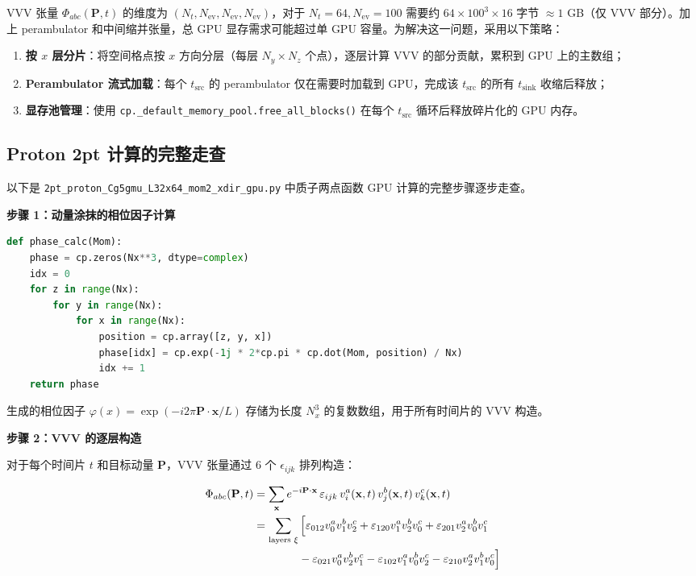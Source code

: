 \documentclass[11pt,a4paper]{ctexart}
\begin{document}
VVV 张量 $\Phi_{abc}(\mathbf{P}, t)$ 的维度为 $(N_t, N_{\text{ev}}, N_{\text{ev}}, N_{\text{ev}})$，对于 $N_t=64, N_{\text{ev}}=100$ 需要约 $64\times 100^3 \times 16$ 字节 $\approx 1$ GB（仅 VVV 部分）。加上 perambulator 和中间缩并张量，总 GPU 显存需求可能超过单 GPU 容量。为解决这一问题，采用以下策略：
\begin{enumerate}
  \item \textbf{按 $x$ 层分片}：将空间格点按 $x$ 方向分层（每层 $N_y\times N_z$ 个点），逐层计算 VVV 的部分贡献，累积到 GPU 上的主数组；
  \item \textbf{Perambulator 流式加载}：每个 $t_{\text{src}}$ 的 perambulator 仅在需要时加载到 GPU，完成该 $t_{\text{src}}$ 的所有 $t_{\text{sink}}$ 收缩后释放；
  \item \textbf{显存池管理}：使用 \texttt{cp.\_default\_memory\_pool.free\_all\_blocks()} 在每个 $t_{\text{src}}$ 循环后释放碎片化的 GPU 内存。
\end{enumerate}

\subsection{Proton 2pt 计算的完整走查}

以下是 \texttt{2pt\_proton\_Cg5gmu\_L32x64\_mom2\_xdir\_gpu.py} 中质子两点函数 GPU 计算的完整步骤逐步走查。

\textbf{步骤 1：动量涂抹的相位因子计算}

\begin{lstlisting}[language=Python]
def phase_calc(Mom):
    phase = cp.zeros(Nx**3, dtype=complex)
    idx = 0
    for z in range(Nx):
        for y in range(Nx):
            for x in range(Nx):
                position = cp.array([z, y, x])
                phase[idx] = cp.exp(-1j * 2*cp.pi * cp.dot(Mom, position) / Nx)
                idx += 1
    return phase
\end{lstlisting}

生成的相位因子 $\varphi(x) = \exp(-i 2\pi \mathbf{P}\cdot\mathbf{x} / L)$ 存储为长度 $N_x^3$ 的复数数组，用于所有时间片的 VVV 构造。

\textbf{步骤 2：VVV 的逐层构造}

对于每个时间片 $t$ 和目标动量 $\mathbf{P}$，VVV 张量通过 6 个 $\epsilon_{ijk}$ 排列构造：

\begin{align}
\Phi_{abc}(\mathbf{P}, t) &= \sum_{\mathbf{x}} e^{-i\mathbf{P}\cdot\mathbf{x}} \,
\varepsilon_{ijk} \, v_i^a(\mathbf{x}, t) \, v_j^b(\mathbf{x}, t) \, v_k^c(\mathbf{x}, t) \\
&= \sum_{\text{layers } \xi} \Big[ \varepsilon_{012} v_0^a v_1^b v_2^c + \varepsilon_{120} v_1^a v_2^b v_0^c + \varepsilon_{201} v_2^a v_0^b v_1^c \notag \\
&\qquad\qquad - \varepsilon_{021} v_0^a v_2^b v_1^c - \varepsilon_{102} v_1^a v_0^b v_2^c - \varepsilon_{210} v_2^a v_1^b v_0^c \Big]
\end{align}
\end{document}
